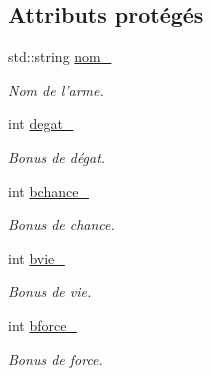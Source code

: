 \subsection*{Attributs protégés}
\begin{DoxyCompactItemize}
\item 
\hypertarget{class_arme_a347394a5ab5c3230259c1b7117f3e8d6}{std\-::string \hyperlink{class_arme_a347394a5ab5c3230259c1b7117f3e8d6}{nom\-\_\-}}\label{class_arme_a347394a5ab5c3230259c1b7117f3e8d6}

\begin{DoxyCompactList}\small\item\em Nom de l'arme. \end{DoxyCompactList}\item 
\hypertarget{class_arme_a15f99a8b95c2d6f5beb9f473df79e399}{int \hyperlink{class_arme_a15f99a8b95c2d6f5beb9f473df79e399}{degat\-\_\-}}\label{class_arme_a15f99a8b95c2d6f5beb9f473df79e399}

\begin{DoxyCompactList}\small\item\em Bonus de dégat. \end{DoxyCompactList}\item 
\hypertarget{class_arme_a688792d4393f9e690aa103a8e68c541c}{int \hyperlink{class_arme_a688792d4393f9e690aa103a8e68c541c}{bchance\-\_\-}}\label{class_arme_a688792d4393f9e690aa103a8e68c541c}

\begin{DoxyCompactList}\small\item\em Bonus de chance. \end{DoxyCompactList}\item 
\hypertarget{class_arme_a4606c075b38ef49f6ed2ed06d6185173}{int \hyperlink{class_arme_a4606c075b38ef49f6ed2ed06d6185173}{bvie\-\_\-}}\label{class_arme_a4606c075b38ef49f6ed2ed06d6185173}

\begin{DoxyCompactList}\small\item\em Bonus de vie. \end{DoxyCompactList}\item 
\hypertarget{class_arme_a779e9838aa9c50d948f58b593fc5954b}{int \hyperlink{class_arme_a779e9838aa9c50d948f58b593fc5954b}{bforce\-\_\-}}\label{class_arme_a779e9838aa9c50d948f58b593fc5954b}

\begin{DoxyCompactList}\small\item\em Bonus de force. \end{DoxyCompactList}\end{DoxyCompactItemize}


